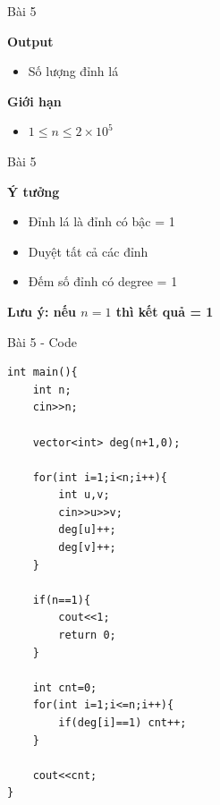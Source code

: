 \begin{frame}{Bài 5}

\textbf{Output}
\begin{itemize}
\item Số lượng đỉnh lá
\end{itemize}

\vspace{0.3cm}

\textbf{Giới hạn}
\begin{itemize}
\item $1 \le n \le 2 \times 10^5$
\end{itemize}

\end{frame}

\begin{frame}{Bài 5}

\textbf{Ý tưởng}

\vspace{0.4cm}

\begin{itemize}
\item Đỉnh lá là đỉnh có bậc = 1
\item Duyệt tất cả các đỉnh
\item Đếm số đỉnh có degree = 1
\end{itemize}

\vspace{0.3cm}

\textbf{Lưu ý: nếu $n=1$ thì kết quả = 1}

\end{frame}

\begin{frame}[fragile]{Bài 5 - Code}

\begin{lstlisting}
int main(){
    int n;
    cin>>n;

    vector<int> deg(n+1,0);

    for(int i=1;i<n;i++){
        int u,v;
        cin>>u>>v;
        deg[u]++;
        deg[v]++;
    }

    if(n==1){
        cout<<1;
        return 0;
    }

    int cnt=0;
    for(int i=1;i<=n;i++){
        if(deg[i]==1) cnt++;
    }

    cout<<cnt;
}
\end{lstlisting}

\end{frame}